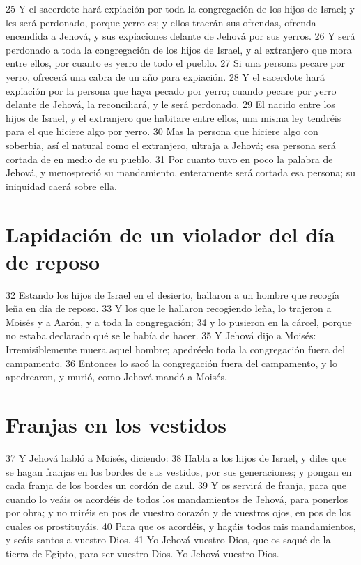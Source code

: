 25 Y el sacerdote hará expiación por toda la congregación de los hijos de Israel; y les será perdonado, porque yerro es; y ellos traerán sus ofrendas, ofrenda encendida a Jehová, y sus expiaciones delante de Jehová por sus yerros.
26 Y será perdonado a toda la congregación de los hijos de Israel, y al extranjero que mora entre ellos, por cuanto es yerro de todo el pueblo.
27 Si una persona pecare por yerro, ofrecerá una cabra de un año para expiación.
28 Y el sacerdote hará expiación por la persona que haya pecado por yerro; cuando pecare por yerro delante de Jehová, la reconciliará, y le será perdonado.
29 El nacido entre los hijos de Israel, y el extranjero que habitare entre ellos, una misma ley tendréis para el que hiciere algo por yerro.
30 Mas la persona que hiciere algo con soberbia, así el natural como el extranjero, ultraja a Jehová; esa persona será cortada de en medio de su pueblo.
31 Por cuanto tuvo en poco la palabra de Jehová, y menospreció su mandamiento, enteramente será cortada esa persona; su iniquidad caerá sobre ella.
\section*{Lapidación de un violador del día de reposo}

32 Estando los hijos de Israel en el desierto, hallaron a un hombre que recogía leña en día de reposo.
33 Y los que le hallaron recogiendo leña, lo trajeron a Moisés y a Aarón, y a toda la congregación;
34 y lo pusieron en la cárcel, porque no estaba declarado qué se le había de hacer.
35 Y Jehová dijo a Moisés: Irremisiblemente muera aquel hombre; apedréelo toda la congregación fuera del campamento.
36 Entonces lo sacó la congregación fuera del campamento, y lo apedrearon, y murió, como Jehová mandó a Moisés.
\section*{Franjas en los vestidos}

37 Y Jehová habló a Moisés, diciendo:
38 Habla a los hijos de Israel, y diles que se hagan franjas en los bordes de sus vestidos, por sus generaciones; y pongan en cada franja de los bordes un cordón de azul.
39 Y os servirá de franja, para que cuando lo veáis os acordéis de todos los mandamientos de Jehová, para ponerlos por obra; y no miréis en pos de vuestro corazón y de vuestros ojos, en pos de los cuales os prostituyáis.
40 Para que os acordéis, y hagáis todos mis mandamientos, y seáis santos a vuestro Dios.
41 Yo Jehová vuestro Dios, que os saqué de la tierra de Egipto, para ser vuestro Dios. Yo Jehová vuestro Dios.


